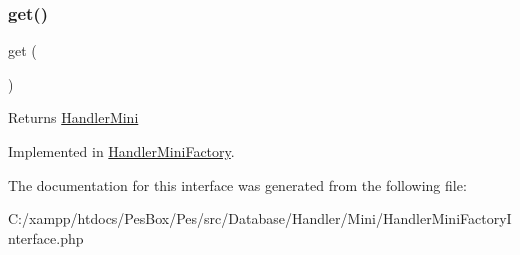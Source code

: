 \subsubsection{\texorpdfstring{get()}{get()}}
{\footnotesize\ttfamily get (\begin{DoxyParamCaption}{ }\end{DoxyParamCaption})}

\begin{DoxyReturn}{Returns}
\mbox{\hyperlink{class_pes_1_1_database_1_1_handler_1_1_mini_1_1_handler_mini}{Handler\+Mini}} 
\end{DoxyReturn}


Implemented in \mbox{\hyperlink{class_pes_1_1_database_1_1_handler_1_1_mini_1_1_handler_mini_factory_ac33ee765f5ad9f134540bac393721cfe}{Handler\+Mini\+Factory}}.



The documentation for this interface was generated from the following file\+:\begin{DoxyCompactItemize}
\item 
C\+:/xampp/htdocs/\+Pes\+Box/\+Pes/src/\+Database/\+Handler/\+Mini/Handler\+Mini\+Factory\+Interface.\+php\end{DoxyCompactItemize}
